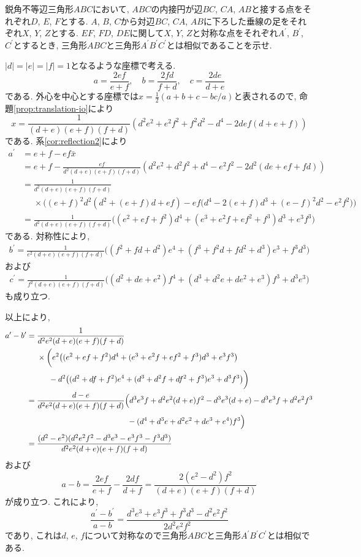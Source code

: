 \begin{bprb}
鋭角不等辺三角形$ABC$において, $ABC$の内接円が辺$BC$, $CA$, $AB$と接する点をそれぞれ$D$, $E$, $F$とする.
$A$, $B$, $C$から対辺$BC$, $CA$, $AB$に下ろした垂線の足をそれぞれ$X$, $Y$, $Z$とする.
$EF$, $FD$, $DE$に関して$X$, $Y$, $Z$と対称な点をそれぞれ$A^\prime$, $B^\prime$, $C^\prime$とするとき, 三角形$ABC$と三角形$A^\prime B^\prime C^\prime$とは相似であることを示せ.
\end{bprb}
\begin{ifsol*}
$\lvert d\rvert=\lvert e\rvert=\lvert f\rvert=1$となるような座標で考える.
\[a=\frac{2ef}{e+f},\quad b=\frac{2fd}{f+d},\quad c=\frac{2de}{d+e}\]
である.
外心を中心とする座標では$x=\frac 12(a+b+c-bc/a)$と表されるので, 命題\ref{prop:translation-io}により
\[x=\frac{1}{(d+e)(e+f)(f+d)}(d^2e^2+e^2f^2+f^2d^2-d^4-2def(d+e+f))\]
である.
系\ref{cor:reflection2}により
\begin{align*}
a^\prime
&=e+f-ef\bar x\\
&=e+f-\frac{ef}{d^2(d+e)(e+f)(f+d)}(d^2e^2+d^2f^2+d^4-e^2f^2-2d^2(de+ef+fd))\\
&=\frac{1}{d^2(d+e)(e+f)(f+d)}\\
&\phantom{{}={}}\times\biggl((e+f)^2d^2(d^2+(e+f)d+ef)-ef\bigl(d^4-2(e+f)d^3+(e-f)^2d^2-e^2f^2\bigr)\biggr)\\
&=\frac{1}{d^2(d+e)(e+f)(f+d)}\bigl((e^2+ef+f^2)d^4+(e^3+e^2f+ef^2+f^3)d^3+e^3f^3\bigr)
\end{align*}
である.
対称性により,
\begin{align*}
b^\prime=\frac{1}{e^2(d+e)(e+f)(f+d)}\bigl((f^2+fd+d^2)e^4+(f^3+f^2d+fd^2+d^3)e^3+f^3d^3\bigr)
\end{align*}
および
\begin{align*}
c^\prime=\frac{1}{f^2(d+e)(e+f)(f+d)}\bigl((d^2+de+e^2)f^4+(d^3+d^2e+de^2+e^3)f^3+d^3e^3\bigr)
\end{align*}
も成り立つ.

以上により,
\begin{align*}
a^\prime-b^\prime
&=\frac{1}{d^2e^2(d+e)(e+f)(f+d)}\\
&\phantom{{}={}}\times\biggl(e^2\bigl((e^2+ef+f^2)d^4+(e^3+e^2f+ef^2+f^3)d^3+e^3f^3\bigr)\\
&\phantom{{}=\times\biggl(}-d^2\bigl((d^2+df+f^2)e^4+(d^3+d^2f+df^2+f^3)e^3+d^3f^3\bigr)\biggr)\\
&=\frac{d-e}{d^2e^2(d+e)(e+f)(f+d)}\Bigl(d^3e^3f+d^2e^2(d+e)f^2-d^3e^3(d+e)-d^3e^3f+d^2e^2f^3\\
&\phantom{=\frac{d-e}{d^2e^2(d+e)(e+f)(f+d)}\Bigl(}-(d^4+d^3e+d^2e^2+de^3+e^4)f^3\Bigr)\\
&=\frac{(d^2-e^2)(d^2e^2f^2-d^3e^3-e^3f^3-f^3d^3)}{d^2e^2(d+e)(e+f)(f+d)}
\end{align*}
および
\[
a-b=\frac{2ef}{e+f}-\frac{2df}{d+f}=\frac{2(e^2-d^2)f^2}{(d+e)(e+f)(f+d)}
\]
が成り立つ.
これにより,
\[\frac{a^\prime-b^\prime}{a-b}=\frac{d^3e^3+e^3f^3+f^3d^3-d^2e^2f^2}{2d^2e^2f^2}\]
であり, これは$d$, $e$, $f$について対称なので三角形$ABC$と三角形$A^\prime B^\prime C^\prime$とは相似である.
\end{ifsol*}